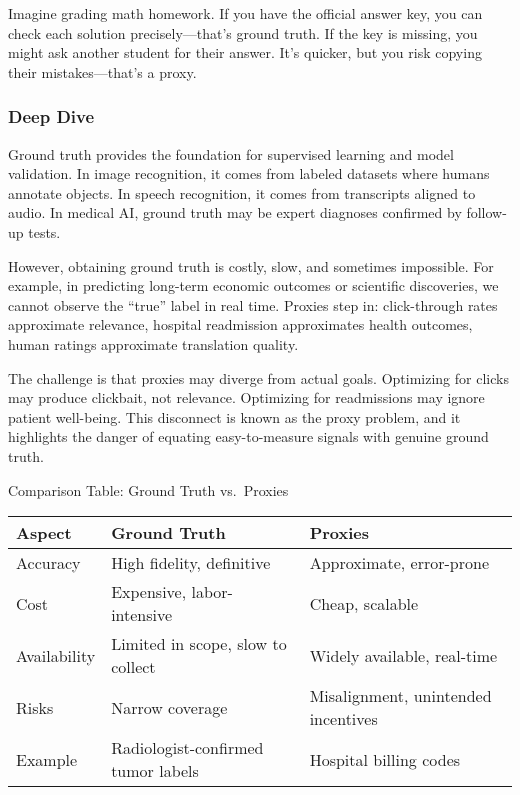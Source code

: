 \documentclass[
  letterpaper,
  DIV=11,
  numbers=noendperiod]{scrreprt}
\begin{document}
Imagine grading math homework. If you have the official answer key, you
can check each solution precisely---that's ground truth. If the key is
missing, you might ask another student for their answer. It's quicker,
but you risk copying their mistakes---that's a proxy.

\subsubsection{Deep Dive}\label{deep-dive-81}

Ground truth provides the foundation for supervised learning and model
validation. In image recognition, it comes from labeled datasets where
humans annotate objects. In speech recognition, it comes from
transcripts aligned to audio. In medical AI, ground truth may be expert
diagnoses confirmed by follow-up tests.

However, obtaining ground truth is costly, slow, and sometimes
impossible. For example, in predicting long-term economic outcomes or
scientific discoveries, we cannot observe the ``true'' label in real
time. Proxies step in: click-through rates approximate relevance,
hospital readmission approximates health outcomes, human ratings
approximate translation quality.

The challenge is that proxies may diverge from actual goals. Optimizing
for clicks may produce clickbait, not relevance. Optimizing for
readmissions may ignore patient well-being. This disconnect is known as
the proxy problem, and it highlights the danger of equating
easy-to-measure signals with genuine ground truth.

Comparison Table: Ground Truth vs.~Proxies

\begin{longtable}[]{@{}
  >{\raggedright\arraybackslash}p{}
  >{\raggedright\arraybackslash}p{}
  >{\raggedright\arraybackslash}p{}@{}}
\toprule\noalign{}
\begin{minipage}[b]{\linewidth}\raggedright
Aspect
\end{minipage} & \begin{minipage}[b]{\linewidth}\raggedright
Ground Truth
\end{minipage} & \begin{minipage}[b]{\linewidth}\raggedright
Proxies
\end{minipage} \\
\midrule\noalign{}
\endhead
\bottomrule\noalign{}
\endlastfoot
Accuracy & High fidelity, definitive & Approximate, error-prone \\
Cost & Expensive, labor-intensive & Cheap, scalable \\
Availability & Limited in scope, slow to collect & Widely available,
real-time \\
Risks & Narrow coverage & Misalignment, unintended incentives \\
Example & Radiologist-confirmed tumor labels & Hospital billing codes \\
\end{longtable}
\end{document}
